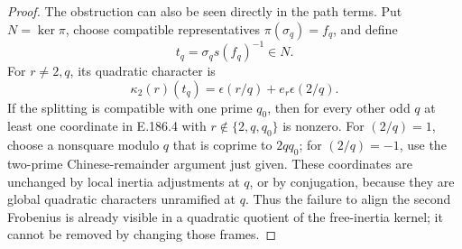 \begin{proof}
The obstruction can also be seen directly in the path
terms. Put \(N=\ker\pi\), choose compatible representatives
\(\pi(\sigma_q)=f_q\), and define
\[
                        t_q=\sigma_q s(f_q)^{-1}\in N.
\]
For \(r\ne2,q\), its quadratic character is
\[
              \kappa_2(r)(t_q)
                    =\epsilon(r/q)+e_r\epsilon(2/q).
 \tag{E.186.4}
\]
If the splitting is compatible with one prime \(q_0\),
then for every other odd \(q\) at least one coordinate
in E.186.4 with \(r\notin\{2,q,q_0\}\) is nonzero.
For \((2/q)=1\), choose a nonsquare modulo \(q\) that
is coprime to \(2q q_0\); for \((2/q)=-1\), use the
two-prime Chinese-remainder argument just given.
These coordinates are unchanged by local inertia
adjustments at \(q\), or by conjugation, because they
are global quadratic characters unramified at \(q\).
Thus the failure to align the second Frobenius is already
visible in a quadratic quotient of the free-inertia kernel;
it cannot be removed by changing those frames.
\end{proof}
